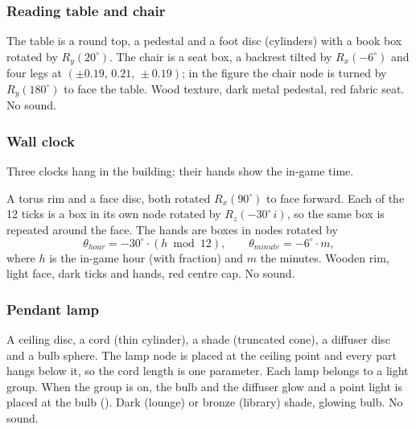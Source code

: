 \subsubsection{Reading table and chair}
 The table is a round top, a pedestal and a foot disc (cylinders) with a book box
rotated by $R_y(20^\circ)$. The chair is a seat box, a backrest tilted by $R_x(-6^\circ)$ and four legs at
$(\pm0.19,\,0.21,\,\pm0.19)$; in the figure the chair node is turned by $R_y(180^\circ)$ to face the table.
 Wood texture, dark metal pedestal, red fabric seat. No sound.

\subsubsection{Wall clock}
Three clocks hang in the building; their hands show the in-game time.

 A torus rim and a face disc, both rotated $R_x(90^\circ)$ to face forward. Each of the
12 ticks is a box in its own node rotated by $R_z(-30^\circ\,i)$, so the same box is repeated around the face.
The hands are boxes in nodes rotated by
\[
\theta_{hour} = -30^\circ\cdot(h \bmod 12),\qquad \theta_{minute} = -6^\circ\cdot m,
\]
where $h$ is the in-game hour (with fraction) and $m$ the minutes.
 Wooden rim, light face, dark ticks and hands, red centre cap. No sound.

\subsubsection{Pendant lamp}
 A ceiling disc, a cord (thin cylinder), a shade (truncated cone), a diffuser disc and a
bulb sphere. The lamp node is placed at the ceiling point and every part hangs below it, so the cord length is
one parameter.
 Each lamp belongs to a light group. When the group is on, the bulb and the diffuser glow
and a point light is placed at the bulb ().
 Dark (lounge) or bronze (library) shade, glowing bulb. No sound.

